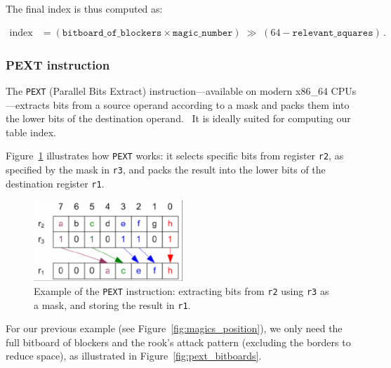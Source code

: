 \vspace{1em}

\noindent The final index is thus computed as:

\begin{align*}
    \text{index}
    &= (\texttt{bitboard\_of\_blockers} \times \texttt{magic\_number})
       \;\gg\;(64 - \texttt{relevant\_squares})\,.
\end{align*}

\subsubsection{PEXT instruction}

\noindent The \texttt{PEXT} (Parallel Bits Extract) instruction—available on modern x86\_64 CPUs—extracts bits from a source operand according to a mask and packs them into the lower bits of the destination operand.~\cite{PextInstruction} It is ideally suited for computing our table index.

Figure~\ref{fig:pext_instruction_example} illustrates how \texttt{PEXT} works: it selects specific bits from register \texttt{r2}, as specified by the mask in \texttt{r3}, and packs the result into the lower bits of the destination register \texttt{r1}.

\begin{figure}[H]
    \centering
    \includegraphics[width=0.5\textwidth]{Imagenes/pext.png}
    \caption{Example of the \texttt{PEXT} instruction: extracting bits from \texttt{r2} using \texttt{r3} as a mask, and storing the result in \texttt{r1}. ~\cite{PextInstruction}}
    \label{fig:pext_instruction_example}
\end{figure}

\noindent For our previous example (see Figure~\ref{fig:magics_position}), we only need the full bitboard of blockers and the rook’s attack pattern (excluding the borders to reduce space), as illustrated in Figure~\ref{fig:pext_bitboards}.


